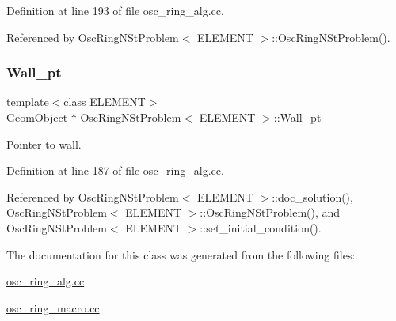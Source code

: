 Definition at line 193 of file osc\+\_\+ring\+\_\+alg.\+cc.



Referenced by Osc\+Ring\+N\+St\+Problem$<$ E\+L\+E\+M\+E\+N\+T $>$\+::\+Osc\+Ring\+N\+St\+Problem().

\mbox{\label{classOscRingNStProblem_a1349ecb860cacb34792fde6807d92905}} 
\subsubsection{\texorpdfstring{Wall\+\_\+pt}{Wall\_pt}}
{\footnotesize\ttfamily template$<$class E\+L\+E\+M\+E\+NT$>$ \\
Geom\+Object $\ast$ \hyperlink{classOscRingNStProblem}{Osc\+Ring\+N\+St\+Problem}$<$ E\+L\+E\+M\+E\+NT $>$\+::Wall\+\_\+pt\hspace{0.3cm}{\ttfamily [private]}}



Pointer to wall. 



Definition at line 187 of file osc\+\_\+ring\+\_\+alg.\+cc.



Referenced by Osc\+Ring\+N\+St\+Problem$<$ E\+L\+E\+M\+E\+N\+T $>$\+::doc\+\_\+solution(), Osc\+Ring\+N\+St\+Problem$<$ E\+L\+E\+M\+E\+N\+T $>$\+::\+Osc\+Ring\+N\+St\+Problem(), and Osc\+Ring\+N\+St\+Problem$<$ E\+L\+E\+M\+E\+N\+T $>$\+::set\+\_\+initial\+\_\+condition().



The documentation for this class was generated from the following files\+:\begin{DoxyCompactItemize}
\item 
\hyperlink{osc__ring__alg_8cc}{osc\+\_\+ring\+\_\+alg.\+cc}\item 
\hyperlink{osc__ring__macro_8cc}{osc\+\_\+ring\+\_\+macro.\+cc}\end{DoxyCompactItemize}
